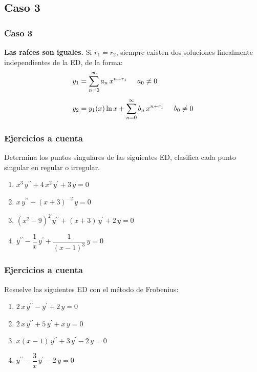 \subsection*{Caso 3}
\begin{frame}
\frametitle{Caso 3}
\textbf{Las raíces son iguales.} Si $r_{1} = r_{2}$, siempre existen dos soluciones linealmente independientes de la ED, de la forma:
\begin{subequations}
\begin{align}
y_{1} &= \sum_{n=0}^{\infty} a_{n} \, x^{n+r_{1}} \hspace{0.5cm} a_{0} \neq 0 \label{eq:ecuacion_21a} \\[0.5em]
y_{2} &= y_{1} (x) \ln x + \sum_{n=0}^{\infty} b_{n} \, x^{n+r_{1}} \hspace{0.5cm} b_{0} \neq 0 \label{eq:ecuacion_21b}
\end{align}
\end{subequations}
\end{frame}
\begin{frame}
\frametitle{Ejercicios a cuenta}
Determina los puntos singulares de las siguientes ED, clasifica cada punto singular en regular o irregular.
\begin{enumerate}
\item $x^{3} \, y^{\prime \prime} + 4 \, x^{2} \, y^{\prime} + 3 \, y = 0$
\item $x \, y^{\prime \prime} - (x + 3)^{-2} \, y = 0$
\item $(x^{2} - 9)^{2} \, y^{\prime \prime} + (x + 3) \, y^{\prime} + 2 \, y = 0$
\item $y^{\prime \prime} - \dfrac{1}{x} \, y^{\prime} + \dfrac{1}{(x - 1)^{3}} \, y = 0$
\end{enumerate}
\end{frame}
\begin{frame}
\frametitle{Ejercicios a cuenta}
Resuelve las siguientes ED con el método de Frobenius:
\begin{enumerate}
\item $2 \, x \, y^{\prime \prime} - y^{\prime} + 2 \, y = 0$
\item $2 \, x \, y^{\prime \prime} + 5 \, y^{\prime} + x \, y = 0$
\item $x (x - 1) \, y^{\prime \prime} + 3 \, y^{\prime} - 2 \, y = 0$
\item $y^{\prime \prime} - \dfrac{3}{x} \, y^{\prime} - 2 \, y = 0$
\end{enumerate}
\end{frame}
